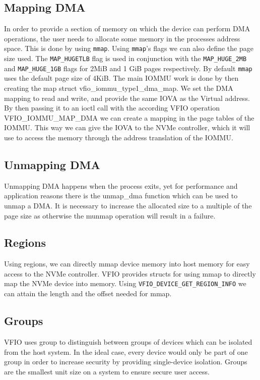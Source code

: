 \subsection{Mapping DMA}
In order to provide a section of memory on which the device can perform DMA operations, the user needs to allocate some memory in the processes address space.
This is done by using \texttt{mmap}.
Using \texttt{mmap}'s flags we can also define the page size used. The \texttt{MAP\_HUGETLB} flag is used in conjunction with the \texttt{MAP\_HUGE\_2MB} and \texttt{MAP\_HUGE\_1GB} flags for 2MiB and 1 GiB pages respectively.
By default \texttt{mmap} uses the default page size of 4KiB.
The main IOMMU work is done by then creating the map struct vfio\_iommu\_type1\_dma\_map. We set the DMA mapping to read and write, and provide the same IOVA as the Virtual address. By then passing it to an ioctl call with the according VFIO operation VFIO\_IOMMU\_MAP\_DMA we can create a mapping in the page tables of the IOMMU. This way we can give the IOVA to the NVMe controller, which it will use to access the memory through the address translation of the IOMMU.

\subsection{Unmapping DMA}
Unmapping DMA happens when the process exits, yet for performance and application reasons there is the unmap\_dma function which can be used to unmap a DMA. It is necessary to increase the allocated size to a multiple of the page size as otherwise the munmap operation will result in a failure.

\subsection{Regions}
Using regions, we can directly mmap device memory into host memory for easy access to the NVMe controller.
VFIO provides structs for using mmap to directly map the NVMe device into memory. Using \texttt{VFIO\_DEVICE\_GET\_REGION\_INFO} we can attain the length and the offset needed for mmap.

\subsection{Groups}
VFIO uses group to distinguish between groups of devices which can be isolated from the host system. In the ideal case, every device would only be part of one group in order to increase security by providing single-device isolation. Groups are the smallest unit size on a system to ensure secure user access.

